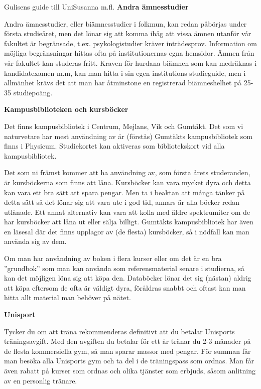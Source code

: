 \documentclass{spektraklet}
\begin{document}
\begin{artikel}{Gulisens guide till Uni}{Susanna m.fl.}
\textbf{Andra ämnesstudier}

Andra ämnesstudier, eller biämnesstudier i folkmun, kan redan påbörjas under första
studieåret, men det lönar sig att komma ihåg att vissa ämnen utanför vår fakultet är begränsade, t.ex. psykologistudier kräver inträdesprov. Information om möjliga begränsningar hittas ofta på institutionernas egna hemsidor. Ämnen från vår fakultet kan studeras fritt. Kraven för hurdana biämnen som kan medräknas i kandidatexamen m.m, kan man hitta i sin egen institutions studieguide, men i allmänhet krävs det att man har åtminstone en registrerad biämneshelhet på 25-35 studiepoäng.


\newpage 

\textbf{Kampusbiblioteken och kursböcker}

Det finns kampusbibliotek i Centrum, Mejlans, Vik och Gumtäkt. Det som vi naturvetare har mest användning av är (förstås) Gumtäkts kampusbibliotek som finns i Physicum. Studiekortet kan aktiveras som bibliotekskort vid alla kampusbibliotek.

Det som ni främst kommer att ha användning av, som första årets studeranden, är kursböckerna som finns att låna. Kursböcker kan vara mycket dyra och detta kan vara ett bra sätt att spara pengar. Men ta i beaktan att många tänker på detta sätt så det lönar sig att vara ute i god tid, annars är alla böcker redan utlånade. Ett annat alternativ kan vara att kolla med äldre spektrumiter om de har kursböcker att låna ut eller sälja billigt. 
Gumtäkts kampusbibliotek har även en läsesal där det finns upplagor av (de flesta) kursböcker, så i nödfall kan man använda sig av dem. 

Om man har användning av boken i flera kurser eller om det är en bra ”grundbok” som man kan använda som referensmaterial senare i studierna, så kan det möjligen löna sig att köpa den. Databöcker lönar det sig (nästan) aldrig att köpa eftersom de ofta är väldigt dyra, föråldras snabbt och oftast kan man hitta allt material man behöver på nätet.

\textbf{Unisport}

Tycker du om att träna rekommenderas definitivt att du betalar Unisports träningsavgift. Med den avgiften du betalar för ett år tränar du 2-3 månader på de flesta kommersiella gym, så man sparar massor med pengar. För summan får man besöka alla Unisports gym och ta del i de träningspass som ordnas. Man får även rabatt på kurser som ordnas och olika tjänster som erbjuds, såsom anlitning av en personlig tränare. 


\end{artikel}
\end{document}

